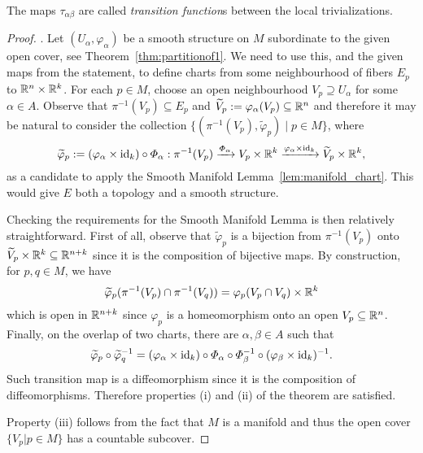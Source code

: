 The maps $\tau_{\alpha\beta}$ are called \emph{transition function}s between the local trivializations.
\begin{proof}
  .
  Let $(U_\alpha, \varphi_\alpha)$ be a smooth structure on $M$ subordinate to the given open cover, see Theorem~\ref{thm:partitionof1}.
  We need to use this, and the given maps from the statement, to define charts from some neighbourhood of fibers $E_p$ to $\mathbb{R}^n\times\mathbb{R}^k$.
  For each $p\in M$, choose an open neighbourhood $V_p \supseteq U_\alpha$ for some $\alpha\in A$.
  Observe that $\pi^{-1}(V_p) \subseteq E_p$ and $\widetilde{V}_p := \varphi_\alpha(V_p) \subseteq \mathbb{R}^n$ and therefore it may be natural to consider the collection $\{(\pi^{-1}(V_p), \widetilde{\varphi}_p)\mid p\in M\}$, where
  \begin{equation}
    \widetilde{\varphi}_p := (\varphi_\alpha\times \operatorname{id}_k) \circ \varPhi_\alpha : \pi^{-1}(V_p) \xrightarrow{\varPhi_\alpha} V_p\times\mathbb{R}^k \xrightarrow{\varphi_\alpha\times \operatorname{id}_k} \widetilde{V}_p\times \mathbb{R}^k,
  \end{equation}
  as a candidate to apply the Smooth Manifold Lemma~\ref{lem:manifold_chart}.
  This would give $E$ both a topology and a smooth structure.

  Checking the requirements for the Smooth Manifold Lemma is then relatively straightforward.
  First of all, observe that $\widetilde{\varphi}_p$ is a bijection from $\pi^{-1}(V_p)$ onto $\widetilde{V}_p\times\mathbb{R}^k \subseteq \mathbb{R}^{n+k}$ since it is the composition of bijective maps.
  By construction, for $p,q\in M$, we have
  \begin{equation}
    \widetilde{\varphi}_p(\pi^{-1}(V_p) \cap \pi^{-1}(V_q)) = \varphi_p(V_p\cap V_q)\times \mathbb{R}^k
  \end{equation}
  which is open in $\mathbb{R}^{n+k}$ since $\varphi_p$ is a homeomorphism onto an open $V_p\subseteq\mathbb{R}^n$.
  Finally, on the overlap of two charts, there are $\alpha, \beta\in A$ such that
  \begin{equation}
    \widetilde{\varphi}_p \circ \widetilde{\varphi}_q^{-1} =
    (\varphi_\alpha \times \operatorname{id}_k) \circ \varPhi_\alpha \circ \varPhi_\beta^{-1} \circ (\varphi_\beta \times \operatorname{id}_k)^{-1}.
  \end{equation}
  Such transition map is a diffeomorphism since it is the composition of diffeomorphisms.
  Therefore properties (i) and (ii) of the theorem are satisfied.

  Property (iii) follows from the fact that $M$ is a manifold and thus the open cover $\{V_p | p \in M\}$ has a countable subcover.


\end{proof}
